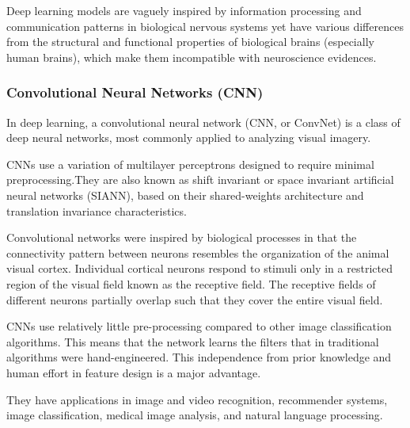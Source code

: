 \documentclass[12pt,a4paper]{article}
\begin{document}
Deep learning models are vaguely inspired by information processing and communication patterns in biological nervous systems yet have various differences from the structural and functional properties of biological brains (especially human brains), which make them incompatible with neuroscience evidences.

\subsubsection{Convolutional Neural Networks (CNN)}
In deep learning, a convolutional neural network (CNN, or ConvNet) is a class of deep neural networks, most commonly applied to analyzing visual imagery.

CNNs use a variation of multilayer perceptrons designed to require minimal preprocessing.They are also known as shift invariant or space invariant artificial neural networks (SIANN), based on their shared-weights architecture and translation invariance characteristics.

Convolutional networks were inspired by biological processes in that the connectivity pattern between neurons resembles the organization of the animal visual cortex. Individual cortical neurons respond to stimuli only in a restricted region of the visual field known as the receptive field. The receptive fields of different neurons partially overlap such that they cover the entire visual field.

CNNs use relatively little pre-processing compared to other image classification algorithms. This means that the network learns the filters that in traditional algorithms were hand-engineered. This independence from prior knowledge and human effort in feature design is a major advantage.

They have applications in image and video recognition, recommender systems, image classification, medical image analysis, and natural language processing.
\end{document}
